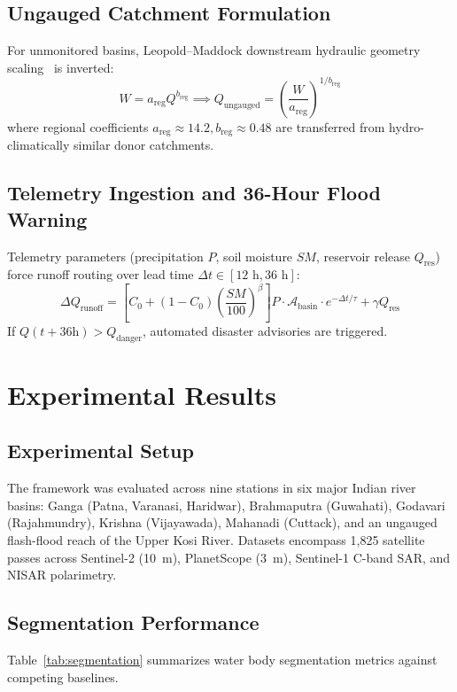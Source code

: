 \documentclass[conference]{IEEEtran}
\begin{document}
\subsection{Ungauged Catchment Formulation}
For unmonitored basins, Leopold--Maddock downstream hydraulic geometry scaling~\cite{leopold1953} is inverted:
\begin{equation}
W = a_{\text{reg}} Q^{b_{\text{reg}}} \implies Q_{\text{ungauged}} = \left( \frac{W}{a_{\text{reg}}} \right)^{1 / b_{\text{reg}}}
\end{equation}
where regional coefficients $a_{\text{reg}} \approx 14.2, b_{\text{reg}} \approx 0.48$ are transferred from hydro-climatically similar donor catchments.

\subsection{Telemetry Ingestion and 36-Hour Flood Warning}
Telemetry parameters (precipitation $P$, soil moisture $SM$, reservoir release $Q_{\text{res}}$) force runoff routing over lead time $\Delta t \in [12\text{ h}, 36\text{ h}]$:
\begin{equation}
\Delta Q_{\text{runoff}} = \left[ C_0 + (1 - C_0) \left( \frac{SM}{100} \right)^\beta \right] P \cdot \mathcal{A}_{\text{basin}} \cdot e^{-\Delta t / \tau} + \gamma Q_{\text{res}}
\end{equation}
If $Q(t + 36\text{h}) > Q_{\text{danger}}$, automated disaster advisories are triggered.

\section{Experimental Results}
\subsection{Experimental Setup}
The framework was evaluated across nine stations in six major Indian river basins: Ganga (Patna, Varanasi, Haridwar), Brahmaputra (Guwahati), Godavari (Rajahmundry), Krishna (Vijayawada), Mahanadi (Cuttack), and an ungauged flash-flood reach of the Upper Kosi River. Datasets encompass 1,825 satellite passes across Sentinel-2 (10~m), PlanetScope (3~m), Sentinel-1 C-band SAR, and NISAR polarimetry.

\subsection{Segmentation Performance}
Table~\ref{tab:segmentation} summarizes water body segmentation metrics against competing baselines.
\end{document}
